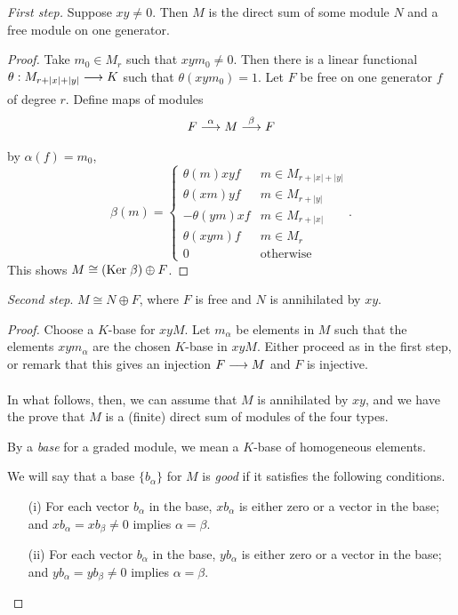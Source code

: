 \documentclass[../main]{subfiles}
\begin{document}
\emph{First step.} Suppose $x y \ne 0$. Then $M$ is the direct sum of some module $N$ and a free module on one generator. 

\begin{proof}
Take $m_0 \in M_r$ such that $x y m_0 \ne 0$. Then there is a linear functional $\theta : M_{r + |x| + |y|} \lar{} K$ such that $\theta(x y m_0) = 1$. Let $F$ be free on one generator $f$ of degree $r$. Define maps of modules \[F \lar{\alpha} M \lar{\beta} F\] by $\alpha(f) = m_0$, \[\beta(m) = \begin{cases}\theta(m)xyf & m \in M_{r + |x| + |y|} \\ \theta(xm) y f & m \in M_{r + |y|} \\ -\theta(ym) x f & m \in M_{r + |x|} \\ \theta(xym)f & m  \in M_r \\ 0 & \text{otherwise}\end{cases}.\] This shows $M \cong (\mathrm{Ker}\hspace{0.1cm} \beta) \oplus F$. 
\end{proof}

\emph{Second step}. $M \cong N \oplus F$, where $F$ is free and $N$ is annihilated by $xy$.

\begin{proof}
Choose a $K$-base for $x y M$. Let $m_\alpha$ be elements in $M$ such that the elements $x y m_\alpha$ are the chosen $K$-base in $x y M$. Either proceed as in the first step, or remark that this gives an injection $F \lar{} M$ and $F$ is injective.

In what follows, then, we can assume that $M$ is annihilated by $x y$, and we have the prove that $M$ is a (finite) direct sum of modules of the four types.

By a \emph{base}  for a graded module, we mean a $K$-base of homogeneous elements. 

We will say that a base $\{b_\alpha\}$ for $M$ is \emph{good} if it satisfies the following conditions. 

\begin{enumerate}
    \item[(i)] For each vector $b_\alpha$ in the base, $x b_\alpha$ is either zero or a vector in the base; and $x b_\alpha = x b_\beta \ne 0$ implies $\alpha = \beta$.
    \item[(ii)] For each vector $b_\alpha$ in the base, $y b_\alpha$ is either zero or a vector in the base; and $y b_\alpha = y b_\beta \ne 0$ implies $\alpha = \beta$. 
\end{enumerate}
\end{proof}
\end{document}

